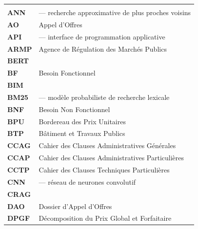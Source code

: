 
\begin{longtable}{@{}L{2.6cm} L{\dimexpr\linewidth-3.2cm\relax}@{}}
\toprule
{}
 &  \\
\midrule
\endfirsthead
\toprule
{}
 &  \\
\midrule
\endhead
\bottomrule
\endfoot

\textbf{ANN}     &  — recherche approximative de plus proches voisins \\
\textbf{AO}      & Appel d'Offres \\
\textbf{API}     &  — interface de programmation applicative \\
\textbf{ARMP}    & Agence de Régulation des Marchés Publics \\
\textbf{BERT}    &  \\
\textbf{BF}      & Besoin Fonctionnel \\
\textbf{BIM}     &  \\
\textbf{BM25}    &  — modèle probabiliste de recherche lexicale \\
\textbf{BNF}     & Besoin Non Fonctionnel \\
\textbf{BPU}     & Bordereau des Prix Unitaires \\
\textbf{BTP}     & Bâtiment et Travaux Publics \\
\textbf{CCAG}    & Cahier des Clauses Administratives Générales \\
\textbf{CCAP}    & Cahier des Clauses Administratives Particulières \\
\textbf{CCTP}    & Cahier des Clauses Techniques Particulières \\
\textbf{CNN}     &  — réseau de neurones convolutif \\
\textbf{CRAG}    &  \\
\textbf{DAO}     & Dossier d'Appel d'Offres \\
\textbf{DPGF}    & Décomposition du Prix Global et Forfaitaire \\

\end{longtable}
